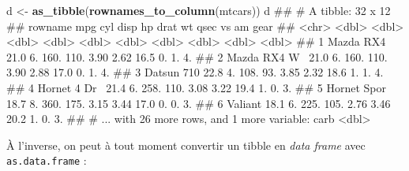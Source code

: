 \documentclass[]{book}
\newenvironment{Shaded}{\begin{snugshade}}{\end{snugshade}}
\newcommand{\KeywordTok}[1]{\textcolor[rgb]{0.13,0.29,0.53}{\textbf{#1}}}
\newcommand{\NormalTok}[1]{#1}
\newcommand{\StringTok}[1]{\textcolor[rgb]{0.31,0.60,0.02}{#1}}
\theoremstyle{definition}
\theoremstyle{definition}
\theoremstyle{definition}
\theoremstyle{remark}
\begin{document}
\begin{Shaded}
\begin{Highlighting}[]
\NormalTok{d <-}\StringTok{ }\KeywordTok{as_tibble}\NormalTok{(}\KeywordTok{rownames_to_column}\NormalTok{(mtcars))}
\NormalTok{d}
\NormalTok{## # A tibble: 32 x 12}
\NormalTok{##   rowname        mpg   cyl  disp    hp  drat    wt  qsec    vs    am  gear}
\NormalTok{##   <chr>        <dbl> <dbl> <dbl> <dbl> <dbl> <dbl> <dbl> <dbl> <dbl> <dbl>}
\NormalTok{## 1 Mazda RX4     21.0    6.  160.  110.  3.90  2.62  16.5    0.    1.    4.}
\NormalTok{## 2 Mazda RX4 W~  21.0    6.  160.  110.  3.90  2.88  17.0    0.    1.    4.}
\NormalTok{## 3 Datsun 710    22.8    4.  108.   93.  3.85  2.32  18.6    1.    1.    4.}
\NormalTok{## 4 Hornet 4 Dr~  21.4    6.  258.  110.  3.08  3.22  19.4    1.    0.    3.}
\NormalTok{## 5 Hornet Spor~  18.7    8.  360.  175.  3.15  3.44  17.0    0.    0.    3.}
\NormalTok{## 6 Valiant       18.1    6.  225.  105.  2.76  3.46  20.2    1.    0.    3.}
\NormalTok{## # ... with 26 more rows, and 1 more variable: carb <dbl>}
\end{Highlighting}
\end{Shaded}

À l'inverse, on peut à tout moment convertir un tibble en \emph{data
frame} avec \texttt{as.data.frame} :
\end{document}
